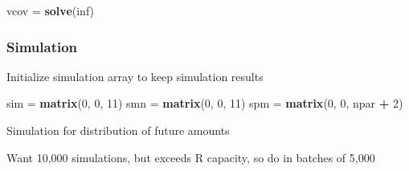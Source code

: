 \documentclass[]{article}
\newenvironment{Shaded}{\begin{snugshade}}{\end{snugshade}}
\newcommand{\DecValTok}[1]{\textcolor[rgb]{0.00,0.00,0.81}{#1}}
\newcommand{\KeywordTok}[1]{\textcolor[rgb]{0.13,0.29,0.53}{\textbf{#1}}}
\newcommand{\NormalTok}[1]{#1}
\newcommand{\OperatorTok}[1]{\textcolor[rgb]{0.81,0.36,0.00}{\textbf{#1}}}
\newcommand{\StringTok}[1]{\textcolor[rgb]{0.31,0.60,0.02}{#1}}
\begin{document}
\begin{Shaded}
\begin{Highlighting}[]
\NormalTok{vcov =}\StringTok{ }\KeywordTok{solve}\NormalTok{(inf)}
\end{Highlighting}
\end{Shaded}

\hypertarget{simulation}{%
\subsubsection{Simulation}\label{simulation}}

Initialize simulation array to keep simulation results

\begin{Shaded}
\begin{Highlighting}[]
\NormalTok{sim =}\StringTok{ }\KeywordTok{matrix}\NormalTok{(}\DecValTok{0}\NormalTok{, }\DecValTok{0}\NormalTok{, }\DecValTok{11}\NormalTok{)}
\NormalTok{smn =}\StringTok{ }\KeywordTok{matrix}\NormalTok{(}\DecValTok{0}\NormalTok{, }\DecValTok{0}\NormalTok{, }\DecValTok{11}\NormalTok{)}
\NormalTok{spm =}\StringTok{ }\KeywordTok{matrix}\NormalTok{(}\DecValTok{0}\NormalTok{, }\DecValTok{0}\NormalTok{, npar }\OperatorTok{+}\StringTok{ }\DecValTok{2}\NormalTok{)}
\end{Highlighting}
\end{Shaded}

Simulation for distribution of future amounts

Want 10,000 simulations, but exceeds R capacity, so do in batches of
5,000
\end{document}
